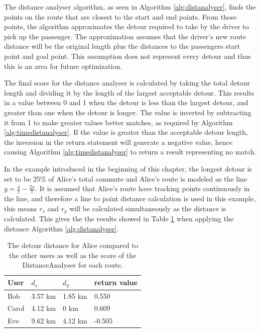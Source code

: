 The distance analyser algorithm, as seen in Algorithm \ref{alg:distanalyser}, finds the points on the route that are closest to the start and end points.
From those points, the algorithm approximates the detour required to take by the driver to pick up the passenger.
The approximation assumes that the driver's new route distance will be the original length plus the distances to the passengers start point and goal point.
This assumption does not represent every detour and thus this is an area for future optimization.

The final score for the distance analyser is calculated by taking the total detour length and dividing it by the length of the largest acceptable detour.
This results in a value between 0 and 1 when the detour is less than the largest detour, and greater than one when the detour is longer.
The value is inverted by subtracting it from 1 to make greater values better matches, as required by Algorithm \ref{alg:timedistanalyser}.
If the value is greater than the acceptable detour length, the inversion in the return statement will generate a negative value, hence causing Algorithm \ref{alg:timedistanalyser} to return a result representing no match.

In the example introduced in the beginning of this chapter, the longest detour is set to be 25\% of Alice's total commute and Alice's route is modeled as the line  $y = \frac{4}{7}-\frac{2 x}{7}$.
It is assumed that Alice's route have tracking points continuously in the line, and therefore a line to point distance calculation is used in this example, this means $r_s$ and $r_g$ will be calculated simultaneously as the distance is calculated.
This gives the the results showed in Table \ref{tbl:distance} when applying the distance  Algorithm \ref{alg:distanalyser}.

\begin{table}[!ht]
\centering
\begin{tabular}{@{}llll@{}}
\toprule
\textbf{User} 	& \textbf{$d_s$} & \textbf{$d_g$} 	& \textbf{return value} 	\\ \midrule
Bob         	& 3.57 km        & 1.85 km	    	& 0.550		 			\\
Carol         	& 4.12 km        & 0 km       		& 0.609        		\\
Eve           	& 9.62 km        & 4.12 km		    & -0.505        		\\ \bottomrule
\end{tabular}
\caption{The detour distance for Alice compared to the other users as well as the score of the DistanceAnalyser for each route.}
\label{tbl:distance}
\end{table}

